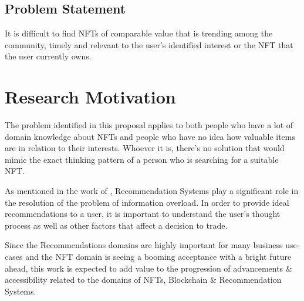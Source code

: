 \documentclass[a4paper, 12pt, oneside]{report}
\begin{document}
\section{Problem Statement}
It is difficult to find NFTs of comparable value that is trending among the community, timely and relevant to the user’s identified interest or the NFT that the user currently owns.

\chapter{Research Motivation}
The problem identified in this proposal applies to both people who have a lot of domain knowledge about NFTs and people who have no idea how valuable items are in relation to their interests. Whoever it is, there's no solution that would mimic the exact thinking pattern of a person who is searching for a suitable NFT.

As mentioned in the work of \textcite{cheng_hybrid_2020}, Recommendation Systems play a significant role in the resolution of the problem of information overload. In order to provide ideal recommendations to a user, it is important to understand the user's thought process as well as other factors that affect a decision to trade.


Since the Recommendations domains are highly important for many business use-cases and the NFT domain is seeing a booming acceptance with a bright future ahead, this work is expected to add value to the progression of advancements \& accessibility related to the domains of NFTs, Blockchain \& Recommendation Systems.
\endgroup
\end{document}
